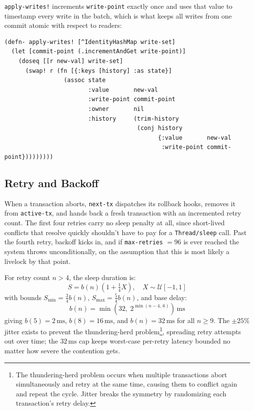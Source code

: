\texttt{apply-writes!} increments \texttt{write-point} exactly once and uses
that value to timestamp every write in the batch, which is what keeps all
writes from one commit atomic with respect to readers:

\begin{listing}[H]
  \begin{verbatim}
(defn- apply-writes! [^IdentityHashMap write-set]
  (let [commit-point (.incrementAndGet write-point)]
    (doseq [[r new-val] write-set]
      (swap! r (fn [{:keys [history] :as state}]
                 (assoc state
                        :value       new-val
                        :write-point commit-point
                        :owner       nil
                        :history     (trim-history
                                      (conj history
                                            {:value       new-val
                                             :write-point commit-point}))))))))
\end{verbatim}
  \caption{Write application. A single increment of the global write point
    timestamps all writes in a commit atomically.}
  \label{lst:apply-writes}
\end{listing}

\subsection{Retry and Backoff}
\label{sec:retry}

When a transaction aborts, \texttt{next-tx} dispatches its rollback hooks,
removes it from \texttt{active-tx}, and hands back a fresh transaction with
an incremented retry count. The first four retries carry no sleep penalty at
all, since short-lived conflicts that resolve quickly shouldn't have to pay for a
\texttt{Thread/sleep} call. Past the fourth retry, backoff kicks in, and if
\texttt{max-retries} $= 96$ is ever reached the system throws unconditionally,
on the assumption that this is most likely a livelock by that point.

For retry count $n > 4$, the sleep duration is:
\begin{equation}
  S = b(n)\!\left(1 + \tfrac{1}{4}X\right), \quad X \sim \mathcal{U}[-1,1]
\end{equation}
with bounds $S_{\min} = \tfrac{3}{4}b(n)$, $S_{\max} = \tfrac{5}{4}b(n)$,
and base delay:
\begin{equation}
  b(n) = \min\!\left(32,\; 2^{\min(n-4,\,6)}\right)\,\text{ms}
\end{equation}
giving $b(5) = 2\,\text{ms}$, $b(8) = 16\,\text{ms}$, and $b(n) = 32\,\text{ms}$
for all $n \geq 9$. The $\pm 25\%$ jitter exists to prevent the
thundering-herd problem\footnote{The thundering-herd problem occurs when multiple transactions
  abort simultaneously and retry at the same time, causing them to conflict again
  and repeat the cycle. Jitter breaks the symmetry by randomizing each
  transaction's retry delay.}, spreading retry attempts out over time; the
$32\,\text{ms}$ cap keeps worst-case per-retry latency bounded no matter how
severe the contention gets.

